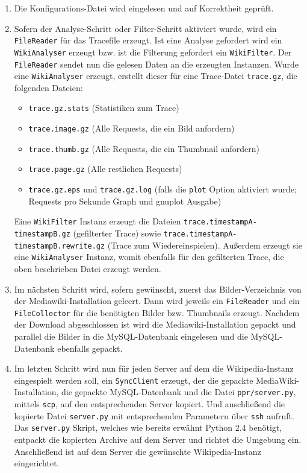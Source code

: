 \begin{enumerate}
\item Die Konfigurations-Datei wird eingelesen und auf Korrektheit geprüft.
\item Sofern der Analyse-Schritt oder Filter-Schritt aktiviert wurde, wird ein \texttt{FileReader} für das Tracefile erzeugt. Ist eine Analyse gefordert wird ein \texttt{WikiAnalyser} erzeugt bzw. ist die Filterung gefordert ein \texttt{WikiFilter}. Der \texttt{FileReader} sendet nun die gelesen Daten an die erzeugten Instanzen. Wurde eine \texttt{WikiAnalyser} erzeugt, erstellt dieser für eine Trace-Datei \texttt{trace.gz}, die folgenden Dateien:
  \begin{itemize}
  \item \texttt{trace.gz.stats} (Statistiken zum Trace)
  \item \texttt{trace.image.gz} (Alle Requests, die ein Bild anfordern)
  \item \texttt{trace.thumb.gz} (Alle Requests, die ein Thumbnail anfordern)
  \item \texttt{trace.page.gz} (Alle restlichen Requests)
  \item \texttt{trace.gz.eps} und \texttt{trace.gz.log} (falls die \texttt{plot} Option aktiviert wurde; Requests pro Sekunde Graph und gnuplot Ausgabe)
  \end{itemize}
Eine \texttt{WikiFilter} Instanz erzeugt die Dateien \texttt{trace.timestampA-timestampB.gz} (gefilterter Trace) sowie \texttt{trace.timestampA-timestampB.rewrite.gz} (Trace zum Wiedereinspielen). Außerdem erzeugt sie eine \texttt{WikiAnalyser} Instanz, womit ebenfalls für den gefilterten Trace, die oben beschrieben Datei erzeugt werden.
\item Im nächsten Schritt wird, sofern gewünscht, zuerst das Bilder-Verzeichnis von der Mediawiki-Installation geleert. Dann wird jeweils ein \texttt{FileReader} und ein \texttt{File\-Collector} für die benötigten Bilder bzw. Thumbnails erzeugt. Nachdem der Download abgeschlossen ist wird die Mediawiki-Installation gepackt und parallel die Bilder in die MySQL-Datenbank eingelesen und die MySQL-Datenbank ebenfalls gepackt.
\item Im letzten Schritt wird nun für jeden Server auf dem die Wikipedia-Instanz eingespielt werden soll, ein \texttt{SyncClient} erzeugt, der die gepackte MediaWiki-Installation, die gepackte MySQL-Datenbank und die Datei \texttt{ppr/server.py}, mittels \texttt{scp}, auf den entsprechenden Server kopiert. Und anschließend die kopierte Datei \texttt{server.py} mit entsprechenden Parametern über \texttt{ssh} aufruft. Das \texttt{server.py} Skript, welches wie bereits erwähnt Python 2.4 benötigt, entpackt die kopierten Archive auf dem Server und richtet die Umgebung ein. Anschließend ist auf dem Server die gewünschte Wikipedia-Instanz eingerichtet.
\end{enumerate}

